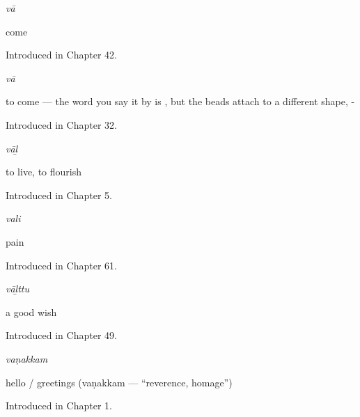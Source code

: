 \noindent\begin{minipage}[t]{\linewidth}
\raggedright
\textbf{}\enspace\emph{vā}\par
\small come\par
\footnotesize Introduced in Chapter 42.
\end{minipage}\par\medskip

\noindent\begin{minipage}[t]{\linewidth}
\raggedright
\textbf{}\enspace\emph{vā}\par
\small to come — the word you say it by is , but the beads attach to a different shape, -\par
\footnotesize Introduced in Chapter 32.
\end{minipage}\par\medskip

\noindent\begin{minipage}[t]{\linewidth}
\raggedright
\textbf{}\enspace\emph{vāḻ}\par
\small to live, to flourish\par
\footnotesize Introduced in Chapter 5.
\end{minipage}\par\medskip

\noindent\begin{minipage}[t]{\linewidth}
\raggedright
\textbf{}\enspace\emph{vali}\par
\small pain\par
\footnotesize Introduced in Chapter 61.
\end{minipage}\par\medskip

\noindent\begin{minipage}[t]{\linewidth}
\raggedright
\textbf{}\enspace\emph{vāḻttu}\par
\small a good wish\par
\footnotesize Introduced in Chapter 49.
\end{minipage}\par\medskip

\noindent\begin{minipage}[t]{\linewidth}
\raggedright
\textbf{}\enspace\emph{vaṇakkam}\par
\small hello / greetings (vaṇakkam — \textquotedblleft{}reverence, homage\textquotedblright{})\par
\footnotesize Introduced in Chapter 1.
\end{minipage}\par\medskip

